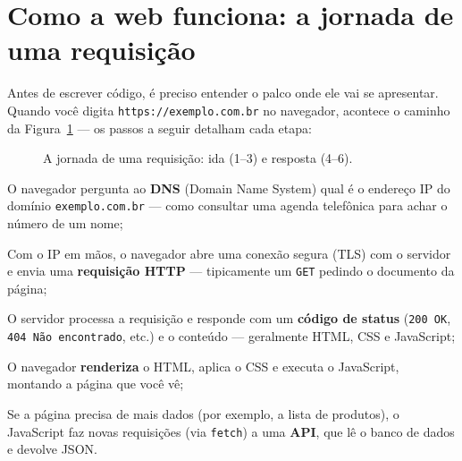 \section{Como a web funciona: a jornada de uma requisição}

Antes de escrever código, é preciso entender o palco onde ele vai se apresentar.
Quando você digita \texttt{https://exemplo.com.br} no navegador, acontece o
caminho da Figura~\ref{fig:jornada-requisicao} — os passos a seguir detalham
cada etapa:

\begin{figure}[htbp]
  \centering
  \caption{A jornada de uma requisição: ida (1--3) e resposta (4--6).}
  \label{fig:jornada-requisicao}
\end{figure}

\begin{passos}
  \item O navegador pergunta ao \textbf{DNS} (Domain Name System) qual é o
  endereço IP do domínio \texttt{exemplo.com.br} — como consultar uma agenda
  telefônica para achar o número de um nome;
  \item Com o IP em mãos, o navegador abre uma conexão segura (TLS) com o
  servidor e envia uma \textbf{requisição HTTP} — tipicamente um \texttt{GET}
  pedindo o documento da página;
  \item O servidor processa a requisição e responde com um \textbf{código de
  status} (\texttt{200 OK}, \texttt{404 Não encontrado}, etc.) e o conteúdo —
  geralmente HTML, CSS e JavaScript;
  \item O navegador \textbf{renderiza} o HTML, aplica o CSS e executa o
  JavaScript, montando a página que você vê;
  \item Se a página precisa de mais dados (por exemplo, a lista de produtos),
  o JavaScript faz novas requisições (via \texttt{fetch}) a uma \textbf{API},
  que lê o banco de dados e devolve JSON.
\end{passos}

